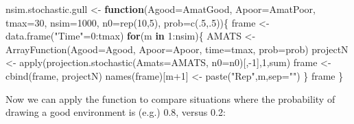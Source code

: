 \documentclass[
]{book}
\newenvironment{Shaded}{\begin{snugshade}}{\end{snugshade}}
\newcommand{\AttributeTok}[1]{\textcolor[rgb]{0.77,0.63,0.00}{#1}}
\newcommand{\ControlFlowTok}[1]{\textcolor[rgb]{0.13,0.29,0.53}{\textbf{#1}}}
\newcommand{\DecValTok}[1]{\textcolor[rgb]{0.00,0.00,0.81}{#1}}
\newcommand{\FunctionTok}[1]{\textcolor[rgb]{0.00,0.00,0.00}{#1}}
\newcommand{\NormalTok}[1]{#1}
\newcommand{\OtherTok}[1]{\textcolor[rgb]{0.56,0.35,0.01}{#1}}
\newcommand{\SpecialCharTok}[1]{\textcolor[rgb]{0.00,0.00,0.00}{#1}}
\newcommand{\StringTok}[1]{\textcolor[rgb]{0.31,0.60,0.02}{#1}}
\begin{document}
\begin{Shaded}
\begin{Highlighting}[]
\NormalTok{nsim.stochastic.gull }\OtherTok{\textless{}{-}} \ControlFlowTok{function}\NormalTok{(}\AttributeTok{Agood=}\NormalTok{AmatGood, }\AttributeTok{Apoor=}\NormalTok{AmatPoor, }\AttributeTok{tmax=}\DecValTok{30}\NormalTok{, }\AttributeTok{nsim=}\DecValTok{1000}\NormalTok{, }\AttributeTok{n0=}\FunctionTok{rep}\NormalTok{(}\DecValTok{10}\NormalTok{,}\DecValTok{5}\NormalTok{), }\AttributeTok{prob=}\FunctionTok{c}\NormalTok{(.}\DecValTok{5}\NormalTok{,.}\DecValTok{5}\NormalTok{))\{}
\NormalTok{  frame }\OtherTok{\textless{}{-}}  \FunctionTok{data.frame}\NormalTok{(}\StringTok{"Time"}\OtherTok{=}\DecValTok{0}\SpecialCharTok{:}\NormalTok{tmax)}
  \ControlFlowTok{for}\NormalTok{(m }\ControlFlowTok{in} \DecValTok{1}\SpecialCharTok{:}\NormalTok{nsim)\{}
\NormalTok{    AMATS }\OtherTok{\textless{}{-}} \FunctionTok{ArrayFunction}\NormalTok{(}\AttributeTok{Agood=}\NormalTok{Agood, }\AttributeTok{Apoor=}\NormalTok{Apoor, }\AttributeTok{time=}\NormalTok{tmax, }\AttributeTok{prob=}\NormalTok{prob)}
\NormalTok{    projectN }\OtherTok{\textless{}{-}} \FunctionTok{apply}\NormalTok{(}\FunctionTok{projection.stochastic}\NormalTok{(}\AttributeTok{Amats=}\NormalTok{AMATS, }\AttributeTok{n0=}\NormalTok{n0)[,}\SpecialCharTok{{-}}\DecValTok{1}\NormalTok{],}\DecValTok{1}\NormalTok{,sum)}
\NormalTok{    frame }\OtherTok{\textless{}{-}} \FunctionTok{cbind}\NormalTok{(frame, projectN)}
     \FunctionTok{names}\NormalTok{(frame)[m}\SpecialCharTok{+}\DecValTok{1}\NormalTok{] }\OtherTok{\textless{}{-}} \FunctionTok{paste}\NormalTok{(}\StringTok{"Rep"}\NormalTok{,m,}\AttributeTok{sep=}\StringTok{""}\NormalTok{)}
\NormalTok{  \}}
\NormalTok{  frame}
\NormalTok{\}}
\end{Highlighting}
\end{Shaded}

Now we can apply the function to compare situations where the probability of drawing a good environment is (e.g.) 0.8, versus 0.2:
\end{document}
